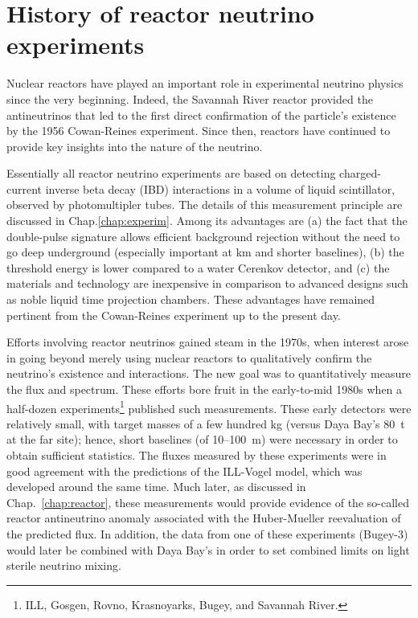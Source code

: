 \documentclass[../thesis.tex]{subfiles}
\begin{document}
\section{History of reactor neutrino experiments}
\label{sec:introReactor}

Nuclear reactors have played an important role in experimental neutrino physics
since the very beginning. Indeed, the Savannah River reactor provided the
antineutrinos that led to the first direct confirmation of the particle's
existence by the 1956 Cowan-Reines experiment. Since then, reactors have
continued to provide key insights into the nature of the neutrino.

Essentially all reactor neutrino experiments are based on detecting
charged-current inverse beta decay (IBD) interactions in a volume of liquid
scintillator, observed by photomultipler tubes. The details of this measurement
principle are discussed in Chap.\ref{chap:experim}. Among its advantages are (a)
the fact that the double-pulse signature allows efficient background rejection
without the need to go deep underground (especially important at km and shorter
baselines), (b) the threshold energy is lower compared to a water Cerenkov
detector, and (c) the materials and technology are inexpensive in comparison to
advanced designs such as noble liquid time projection chambers. These advantages
have remained pertinent from the Cowan-Reines experiment up to the present day.

Efforts involving reactor neutrinos gained steam in the 1970s, when interest
arose in going beyond merely using nuclear reactors to qualitatively confirm the
neutrino's existence and interactions. The new goal was to quantitatively
measure the flux and spectrum. These efforts bore fruit in the early-to-mid
1980s when a half-dozen experiments\footnote{ILL, Gosgen, Rovno, Krasnoyarks,
  Bugey, and Savannah River.} published such measurements. These early detectors
were relatively small, with target masses of a few hundred kg (versus Daya Bay's
80~t at the far site); hence, short baselines (of 10--100~m) were necessary in
order to obtain sufficient statistics. The fluxes measured by these experiments
were in good agreement with the predictions of the ILL-Vogel model, which was
developed around the same time. Much later, as discussed in
Chap.~\ref{chap:reactor}, these measurements would provide evidence of the
so-called reactor antineutrino anomaly associated with the Huber-Mueller
reevaluation of the predicted flux. In addition, the data from one of these
experiments (Bugey-3) would later be combined with Daya Bay's in order to set
combined limits on light sterile neutrino mixing.
\end{document}
